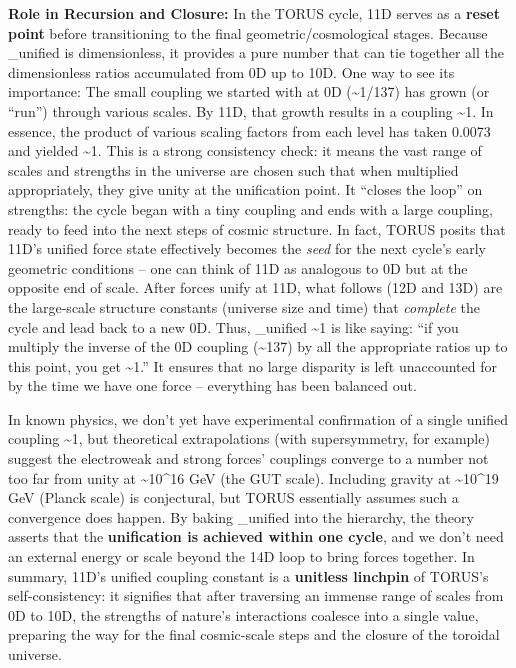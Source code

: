 \documentclass[
]{article}
\begin{document}
\textbf{Role in Recursion and Closure:} In the TORUS cycle, 11D serves
as a \textbf{reset point} before transitioning to the final
geometric/cosmological stages. Because \alpha\_unified is dimensionless, it
provides a pure number that can tie together all the dimensionless
ratios accumulated from 0D up to 10D. One way to see its importance: The
small coupling we started with at 0D (\alpha \textasciitilde1/137) has grown
(or ``run'') through various scales. By 11D, that growth results in a
coupling \textasciitilde1. In essence, the product of various scaling
factors from each level has taken 0.0073 and yielded
\textasciitilde1\hspace{0pt}. This is a strong consistency check: it
means the vast range of scales and strengths in the universe are chosen
such that when multiplied appropriately, they give unity at the
unification point. It ``closes the loop'' on strengths: the cycle began
with a tiny coupling and ends with a large coupling, ready to feed into
the next steps of cosmic structure\hspace{0pt}. In fact, TORUS posits
that 11D's unified force state effectively becomes the \emph{seed} for
the next cycle's early geometric conditions -- one can think of 11D as
analogous to 0D but at the opposite end of scale\hspace{0pt}. After
forces unify at 11D, what follows (12D and 13D) are the large-scale
structure constants (universe size and time) that \emph{complete} the
cycle and lead back to a new 0D. Thus, \alpha\_unified \textasciitilde1 is
like saying: ``if you multiply the inverse of the 0D coupling
(\textasciitilde137) by all the appropriate ratios up to this point, you
get \textasciitilde1.'' It ensures that no large disparity is left
unaccounted for by the time we have one force -- everything has been
balanced out.

In known physics, we don't yet have experimental confirmation of a
single unified coupling \textasciitilde1, but theoretical extrapolations
(with supersymmetry, for example) suggest the electroweak and strong
forces' couplings converge to a number not too far from unity at
\textasciitilde10\^{}16 GeV (the GUT scale)\hspace{0pt}. Including
gravity at \textasciitilde10\^{}19 GeV (Planck scale) is conjectural,
but TORUS essentially assumes such a convergence does happen. By baking
\alpha\_unified  into the hierarchy, the theory asserts that the
\textbf{unification is achieved within one cycle}, and we don't need an
external energy or scale beyond the 14D loop to bring forces together.
In summary, 11D's unified coupling constant is a \textbf{unitless
linchpin} of TORUS's self-consistency: it signifies that after
traversing an immense range of scales from 0D to 10D, the strengths of
nature's interactions coalesce into a single value, preparing the way
for the final cosmic-scale steps and the closure of the toroidal
universe.
\end{document}
